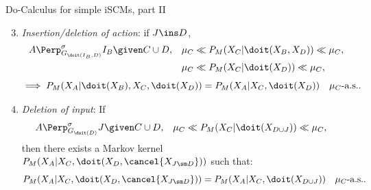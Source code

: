 \begin{frame}{Do-Calculus for simple iSCMs, part II}
  \begin{Thm}
  \small
  \begin{enumerate}
     \setcounter{enumi}{2}
     \item \emph{Insertion/deletion of action}: if $J \ins D$,
       \begin{align*} 
           A &\Perp^\sigma_{G_{\doit(I_B,D)}} I_B \given C  \cup D, &          
           \mu_C &\ll P_M(X_C|\doit(X_B,X_{D})) \ll \mu_C, \\
                 && \mu_C &\ll P_M(X_C|\doit(X_{D})) \ll \mu_C,
       \end{align*}
       \[ \implies  P_M(X_A|\doit(X_B),X_C,\doit(X_{D})) = P_M(X_A|X_C,\doit(X_{D})) \quad \mu_C\text{-a.s.}.\]
     \item \emph{Deletion of input}: 
         If 
         \begin{align*} 
           A &\Perp^\sigma_{G_{\doit(D)}} J \given C \cup D, &
             \mu_C &\ll P_M(X_C|\doit(X_{D\cup J})) \ll \mu_C,
         \end{align*}
         then there exists a Markov kernel $P_M(X_A|X_C,\doit(X_{D},\cancel{X_{J\sm D}}))$ such that:
         \[ P_M(X_A|X_C,\doit(X_{D},\cancel{X_{J\sm D}})) = P_M(X_A|X_C,\doit(X_{D \cup J})) \quad \mu_C\text{-a.s.}. \]
    \end{enumerate}
\end{Thm}
\end{frame}


